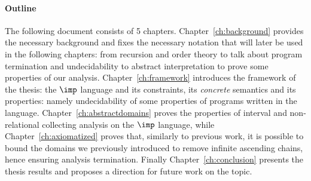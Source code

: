 \paragraph*{Outline}
The following document consists of 5
chapters. Chapter~\ref{ch:background} provides the necessary
background and fixes the necessary notation that will later be used in
the following chapters: from recursion and order theory to talk about
program termination and undecidability to abstract interpretation to
prove some properties of our analysis. Chapter~\ref{ch:framework}
introduces the framework of the thesis: the \(\imp\) language and its
constraints, its \emph{concrete} semantics and its properties: namely
undecidability of some properties of programs written in the
language. Chapter~\ref{ch:abstractdomains} proves the properties of
interval and non-relational collecting analysis on the \(\imp\)
language, while Chapter~\ref{ch:axiomatized} proves that, similarly to
previous work, it is possible to bound the domains we previously
introduced to remove infinite ascending chains, hence ensuring
analysis termination. Finally Chapter~\ref{ch:conclusion} presents the
thesis results and proposes a direction for future work on the topic.
